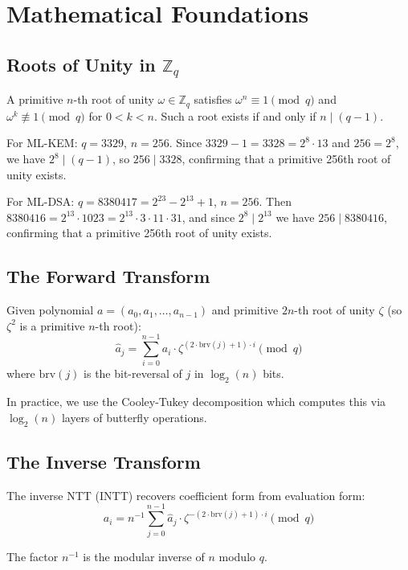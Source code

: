\section{Mathematical Foundations}


\subsection{Roots of Unity in $\mathbb{Z}_q$}

A primitive $n$-th root of unity $\omega \in \mathbb{Z}_q$ satisfies $\omega^n \equiv 1
\pmod{q}$ and $\omega^k \not\equiv 1 \pmod{q}$ for $0 < k < n$. Such a root exists if
and only if $n \mid (q - 1)$.

For ML-KEM: $q = 3329$, $n = 256$. Since $3329 - 1 = 3328 = 2^8 \cdot 13$ and $256 = 2^8$,
we have $2^8 \mid (q - 1)$, so $256 \mid 3328$, confirming that a primitive 256th root of
unity exists.

For ML-DSA: $q = 8380417 = 2^{23} - 2^{13} + 1$, $n = 256$. Then $8380416 = 2^{13} \cdot 1023
= 2^{13} \cdot 3 \cdot 11 \cdot 31$, and since $2^8 \mid 2^{13}$ we have $256 \mid 8380416$,
confirming that a primitive 256th root of unity exists.

\subsection{The Forward Transform}

\begin{definition}
Given polynomial $a = (a_0, a_1, \ldots, a_{n-1})$ and primitive $2n$-th root of unity
$\zeta$ (so $\zeta^2$ is a primitive $n$-th root):
\[
\hat{a}_j = \sum_{i=0}^{n-1} a_i \cdot \zeta^{(2 \cdot \text{brv}(j) + 1) \cdot i} \pmod{q}
\]
where $\text{brv}(j)$ is the bit-reversal of $j$ in $\log_2(n)$ bits.
\end{definition}

In practice, we use the Cooley-Tukey decomposition which computes this via $\log_2(n)$
layers of butterfly operations.

\subsection{The Inverse Transform}

The inverse NTT (INTT) recovers coefficient form from evaluation form:
\[
a_i = n^{-1} \sum_{j=0}^{n-1} \hat{a}_j \cdot \zeta^{-(2 \cdot \text{brv}(j) + 1) \cdot i} \pmod{q}
\]

The factor $n^{-1}$ is the modular inverse of $n$ modulo $q$.

